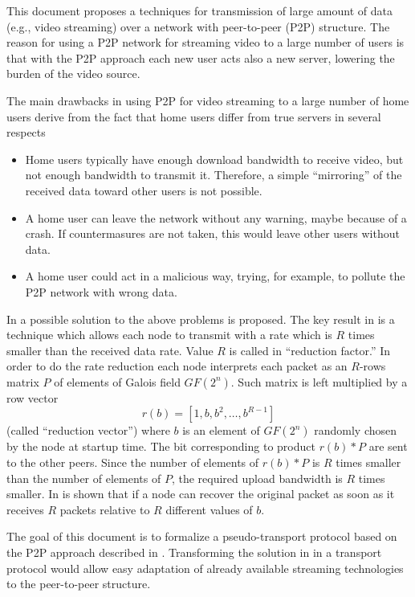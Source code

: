 \documentclass{rfc}
\begin{document}
This document proposes a techniques for transmission of large amount
of data (e.g., video streaming) over a network with peer-to-peer (P2P)
structure.  The reason for using a P2P network for streaming video to
a large number of users is that with the P2P approach each new user
acts also a new server, lowering the burden of the video source.

The main drawbacks in using P2P for video streaming to a large number
of home users derive from the fact that home users differ from true
servers in several respects

\begin{itemize}
\item
Home users typically have enough download bandwidth to receive video,
but not enough bandwidth to transmit it.  Therefore, a simple
``mirroring'' of the received data toward other users is not possible.
\item
A home user can leave the network without any warning, maybe because
of a crash.  If countermasures are not taken, this would leave other
users without data.
\item
A home user could act in a malicious way, trying, for example, to
pollute the P2P network with wrong data.
\end{itemize}
%
In \cite{bernardini08:dcc08} a possible solution to the above problems
is proposed.  The key result in \cite{bernardini08:dcc08} is a
technique which allows each node to transmit with a rate which is $R$
times smaller than the received data rate.  Value $R$ is called in
\cite{bernardini08:dcc08} ``reduction factor.''  In order to do the
rate reduction each node interprets each packet as an $R$-rows matrix
$P$ of elements of Galois field $GF(2^n)$.  Such matrix is left
multiplied by a row vector
$$
r(b) = [1, b, b^2, \ldots, b^{R-1}]
$$
%
(called ``reduction vector'') where $b$ is an element of $GF(2^n)$
randomly chosen by the node at startup time.  The bit corresponding to
product $r(b)*P$ are sent to the other peers.  Since the number of
elements of $r(b)*P$ is $R$ times smaller than the number of elements
of $P$, the required upload bandwidth is $R$ times smaller.  In
\cite{bernardini08:dcc08} is shown that if a node can recover the
original packet as soon as it receives $R$ packets relative to $R$
different values of $b$.

The goal of this document is to formalize a pseudo-transport protocol
based on the P2P approach described in \cite{bernardini08:dcc08}.
Transforming the solution  in \cite{bernardini08:dcc08} in a transport
protocol would allow easy adaptation of already available streaming
technologies to the peer-to-peer structure.
\end{document}
